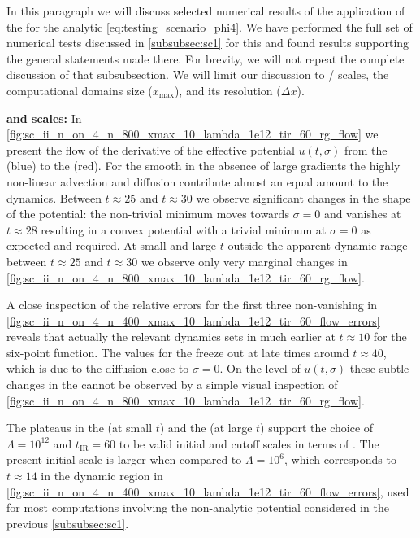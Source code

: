 In this paragraph we will discuss selected numerical results of the application of the \ktScheme{} for the analytic \ic{} \eqref{eq:testing_scenario_phi4}.
We have performed the full set of numerical tests discussed in \cref{subsubsec:sc1} for this \ic{} and found results supporting the general statements made there.
For brevity, we will not repeat the complete discussion of that subsubsection.
We will limit our discussion to \uv{}/\ir{} scales, the computational domains size ($x_\mathrm{max}$), and its resolution ($\Delta x$). \bigskip

\textbf{\uv{} and \ir{} scales:}
In \cref{fig:sc_ii_n_on_4_n_800_xmax_10_lambda_1e12_tir_60_rg_flow} we present the \frg{} flow of the derivative of the effective potential $u ( t, \sigma )$ from the \uv{} ({blue}) to the \ir{} ({red}).
For the smooth \ic{} \dash{} in the absence of large gradients \dash{} the highly non-linear advection and diffusion contribute almost an equal amount to the dynamics.
Between $t \approx 25$ and $t \approx 30$ we observe significant changes in the shape of the potential: the non-trivial minimum moves towards $\sigma = 0$ and vanishes at $t \approx 28$ resulting in a convex potential with a trivial minimum at $\sigma = 0$ as expected and required.
At small and large $t$ outside the apparent dynamic range between $t \approx 25$ and $t \approx 30$ we observe only very marginal changes in \cref{fig:sc_ii_n_on_4_n_800_xmax_10_lambda_1e12_tir_60_rg_flow}.

A close inspection of the relative errors for the first three non-vanishing \nptFunctions{} in \cref{fig:sc_ii_n_on_4_n_400_xmax_10_lambda_1e12_tir_60_flow_errors} reveals that actually the relevant dynamics sets in much earlier at $t \approx 10$ for the six-point function.
The values for the \nptFunctions{} freeze out at late times around $t \approx 40$, which is due to the diffusion close to $\sigma = 0$.
On the level of $u ( t, \sigma )$ these subtle changes in the \nptFunctions{} cannot be observed by a simple visual inspection of \cref{fig:sc_ii_n_on_4_n_800_xmax_10_lambda_1e12_tir_60_rg_flow}.

The plateaus in the \uv{} (at small $t$) and the \ir{} (at large $t$) support the choice of $\Lambda=10^{12}$ and $t_\mathrm{IR}=60$ to be valid initial \uv{} and \ir{} cutoff scales in terms of \rgcy{}. 
The present \uv{} initial scale is larger when compared to $\Lambda=10^{6}$, which corresponds to $t \approx 14$ in the dynamic region in \cref{fig:sc_ii_n_on_4_n_400_xmax_10_lambda_1e12_tir_60_flow_errors}, used for most computations involving the non-analytic potential considered in the previous \cref{subsubsec:sc1}. 

